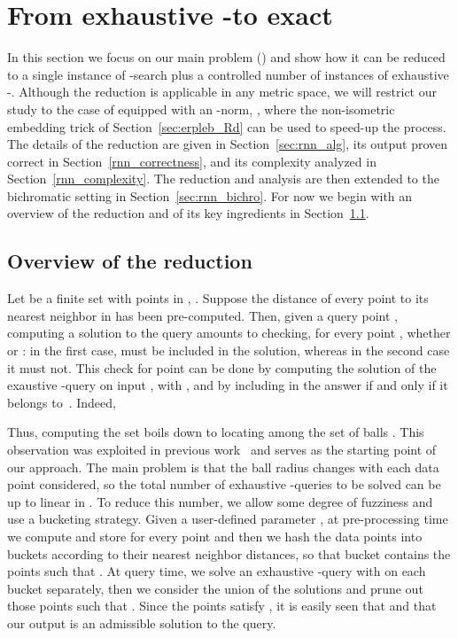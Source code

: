 \section{From exhaustive -\pleb to exact \rnn}
\label{sec:rnn}

In this section we focus on our main problem (\rnn) and show how
it can be reduced to a single instance of -\nn search plus a
controlled number of instances of exhaustive -\pleb. Although the
reduction is applicable in any metric space, we will restrict our
study to the case of  equipped with an -norm, , where the non-isometric embedding trick of
  Section~\ref{sec:erpleb_Rd} can be used to speed-up the process. The
  details of the reduction are given in Section~\ref{sec:rnn_alg}, its
  output proven correct in Section~\ref{rnn_correctness}, and its
  complexity analyzed in Section~\ref{rnn_complexity}. The reduction
  and analysis are then extended to the bichromatic setting in
  Section~\ref{sec:rnn_bichro}.  For now we begin with an overview of
  the reduction and of its key ingredients in
  Section~\ref{sec:rnn_overview}.


\subsection{Overview of the reduction}
\label{sec:rnn_overview}

Let  be a finite set with  points in , .  Suppose the distance of every point  to its nearest
  neighbor in  has been pre-computed. Then, given a query point
  , computing a solution to the \rnn query amounts to
  checking, for every point , whether  or : in the first case,  must be
  included in the solution, whereas in the second case it must
  not. This check for point  can be done by computing the solution
   of the exaustive -\pleb query on input , with
  , and by including  in the answer if and only if it
  belongs to~. Indeed, 
 
Thus, computing the set  boils down to locating  among
the set of balls .  This
observation was exploited in previous work~\cite{KM00} and serves as
the starting point of our approach.  The main problem is that the ball
radius  changes with each data point  considered, so the
total number of exhaustive -\pleb queries to be solved can be up to
linear in . To reduce this number, we allow some degree of
fuzziness and use a bucketing strategy. Given a user-defined parameter
, at pre-processing time we compute and store  for
every point  and then we hash the data points into buckets
according to their nearest neighbor distances, so that bucket 
contains the points  such that
. At query time, we
  solve an exhaustive -\pleb query with  on each
  bucket  separately, then we consider the union  of the
  solutions and prune out those points  such that
  . Since the points  satisfy
  , it is easily seen that
   and that our output
  is an admissible solution to the \rnn query.

